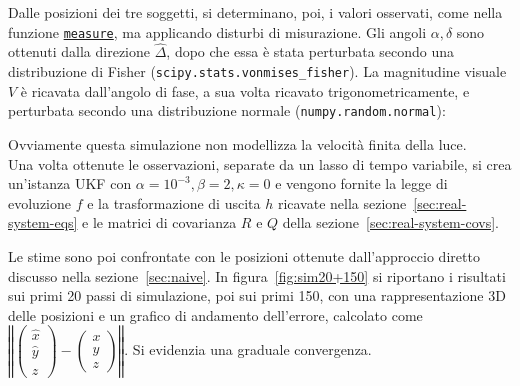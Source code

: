 \documentclass[12pt,a4paper,openright,twoside]{book}
\begin{document}
Dalle posizioni dei tre soggetti, si determinano, poi, i valori osservati, come nella funzione \hyperref[lst:measure]{\lstinline{measure}}, ma applicando disturbi di misurazione. Gli angoli $\alpha,\delta$ sono ottenuti dalla direzione $\hat{\Delta}$, dopo che essa è stata perturbata secondo una distribuzione di Fisher (\lstinline{scipy.stats.vonmises_fisher}). La magnitudine visuale $V$ è ricavata dall'angolo di fase, a sua volta ricavato trigonometricamente, e perturbata secondo una distribuzione normale (\lstinline{numpy.random.normal}):



Ovviamente questa simulazione non modellizza la velocità finita della luce. \\

Una volta ottenute le osservazioni, separate da un lasso di tempo variabile, si crea un'istanza UKF con $\alpha=10^{-3},\beta=2,\kappa=0$ e vengono fornite la legge di evoluzione $f$ e la trasformazione di uscita $h$ ricavate nella sezione~\ref{sec:real-system-eqs} e le matrici di covarianza $R$ e $Q$ della sezione~\ref{sec:real-system-covs}.



Le stime sono poi confrontate con le posizioni ottenute dall'approccio diretto discusso nella sezione~\ref{sec:naive}. In figura~\ref{fig:sim20+150} si riportano i risultati sui primi 20 passi di simulazione, poi sui primi 150, con una rappresentazione 3D delle posizioni e un grafico di andamento dell'errore, calcolato come $\left\Vert\left(\begin{smallmatrix}\hat{x}\\\hat{y}\\\hat{z}\end{smallmatrix}\right)-\left(\begin{smallmatrix}x\\y\\z\end{smallmatrix}\right)\right\Vert$. Si evidenzia una graduale convergenza.
\end{document}
